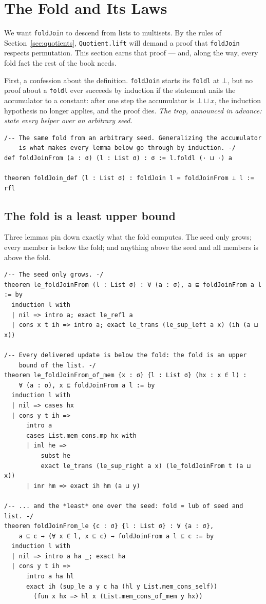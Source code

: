 \documentclass[12pt, a4paper, openright]{book}
\theoremstyle{thmstyle}
\theoremstyle{defstyle}
\newcommand{\lc}[1]{\texttt{#1}}
\begin{document}
\section{The Fold and Its Laws}

We want \lc{foldJoin} to descend from lists to multisets. By the rules of
Section~\ref{sec:quotients}, \lc{Quotient.lift} will demand a proof that
\lc{foldJoin} respects permutation. This section earns that proof --- and,
along the way, every fold fact the rest of the book needs.

First, a confession about the definition. \lc{foldJoin} starts its
\lc{foldl} at $\bot$, but no proof about a \lc{foldl} ever succeeds by
induction if the statement nails the accumulator to a constant: after one
step the accumulator is $\bot \sqcup x$, the induction hypothesis no
longer applies, and the proof dies. \emph{The trap, announced in advance:
state every helper over an arbitrary seed.}

\begin{verbatim}
/-- The same fold from an arbitrary seed. Generalizing the accumulator
    is what makes every lemma below go through by induction. -/
def foldJoinFrom (a : σ) (l : List σ) : σ := l.foldl (· ⊔ ·) a

theorem foldJoin_def (l : List σ) : foldJoin l = foldJoinFrom ⊥ l := rfl
\end{verbatim}

\subsection{The fold is a least upper bound}

Three lemmas pin down exactly what the fold computes. The seed only
grows; every member is below the fold; and anything above the seed and
all members is above the fold.

\begin{verbatim}
/-- The seed only grows. -/
theorem le_foldJoinFrom (l : List σ) : ∀ (a : σ), a ⊑ foldJoinFrom a l := by
  induction l with
  | nil => intro a; exact le_refl a
  | cons x t ih => intro a; exact le_trans (le_sup_left a x) (ih (a ⊔ x))

/-- Every delivered update is below the fold: the fold is an upper
    bound of the list. -/
theorem le_foldJoinFrom_of_mem {x : σ} {l : List σ} (hx : x ∈ l) :
    ∀ (a : σ), x ⊑ foldJoinFrom a l := by
  induction l with
  | nil => cases hx
  | cons y t ih =>
      intro a
      cases List.mem_cons.mp hx with
      | inl he =>
          subst he
          exact le_trans (le_sup_right a x) (le_foldJoinFrom t (a ⊔ x))
      | inr hm => exact ih hm (a ⊔ y)

/-- ... and the *least* one over the seed: fold = lub of seed and list. -/
theorem foldJoinFrom_le {c : σ} {l : List σ} : ∀ {a : σ},
    a ⊑ c → (∀ x ∈ l, x ⊑ c) → foldJoinFrom a l ⊑ c := by
  induction l with
  | nil => intro a ha _; exact ha
  | cons y t ih =>
      intro a ha hl
      exact ih (sup_le a y c ha (hl y List.mem_cons_self))
        (fun x hx => hl x (List.mem_cons_of_mem y hx))
\end{verbatim}
\end{document}
